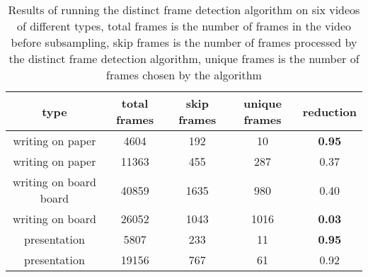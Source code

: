 \begin{table}[!ht]
    \centering
    \caption{Results of running the distinct frame detection algorithm on six videos of different types, total frames is the number of frames in the video before subsampling, skip frames is the number of frames processed by the distinct frame detection algorithm, unique frames is the number of frames chosen by the algorithm}
    \begin{tabular}{|c|c|c|c|c|}
    \hline
        \textbf{type} & \textbf{total frames} & \textbf{skip frames} & \textbf{unique frames} & \textbf{reduction} \\ \hline
        writing on paper & 4604 & 192 & 10 & \textbf{0.95} \\ \hline
        writing on paper & 11363 & 455 & 287 & 0.37 \\ \hline
        writing on board board & 40859 & 1635 & 980 & 0.40 \\ \hline
        writing on board & 26052 & 1043 & 1016 & \textbf{0.03} \\ \hline
        presentation & 5807 & 233 & 11 & \textbf{0.95} \\ \hline
        presentation & 19156 & 767 & 61 & 0.92 \\ \hline
    \end{tabular}
    \label{tab:uniqueframedetresults}
\end{table}